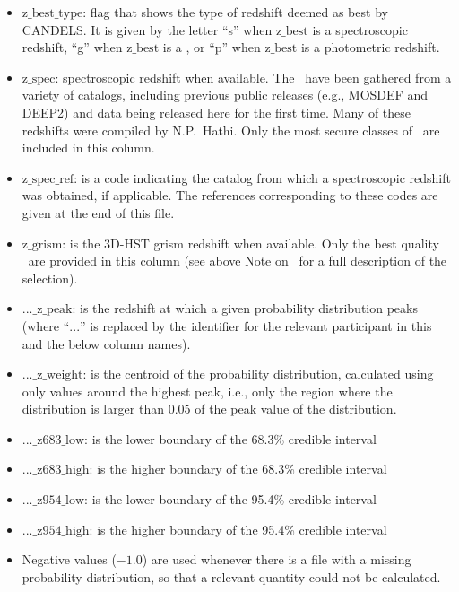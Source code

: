 \begin{itemize}
\item $\mathrm{z\_best\_type}$: flag that shows the type of redshift deemed as best by CANDELS.  It is given by the letter ``s'' when $\mathrm{z\_best}$ is a spectroscopic redshift, ``g'' when $\mathrm{z\_best}$ is a \grismz, or ``p'' when $\mathrm{z\_best}$ is a photometric redshift.

\item $\mathrm{z\_spec}$: spectroscopic redshift when available.  The \speczs\ have been gathered from a variety of catalogs, including previous public releases (e.g., MOSDEF and DEEP2) and data being released here for the first time.  Many of these redshifts were compiled by N.P.~Hathi. Only the most secure classes of \speczs\ are included in this column.

\item $\mathrm{z\_spec\_ref}$: is a code indicating the catalog from which a spectroscopic redshift was obtained, if applicable.
   The references corresponding to these codes are given at the end of this file.

\item $\mathrm{z\_grism}$: is the 3D-HST grism redshift when available.  Only the best quality \grismzs\ are provided in this column (see above Note on \zbest\ for a full description of the selection).

\item $\mathrm{...\_z\_peak}$: is the redshift at which a given probability distribution peaks
   (where ``$...$'' is replaced by the identifier for the relevant participant in this and the below column names).

\item $\mathrm{...\_z\_weight}$: is the centroid of the probability distribution, calculated using only values around the highest peak, i.e., only the region where the distribution is larger than 0.05 of the peak value of the distribution.

\item $\mathrm{...\_z683\_low}$: is the lower boundary of the 68.3\% credible interval

\item $\mathrm{...\_z683\_high}$: is the higher boundary of the 68.3\% credible interval

\item $\mathrm{...\_z954\_low}$: is the lower boundary of the 95.4\% credible interval

\item $\mathrm{...\_z954\_high}$: is the higher boundary of the 95.4\% credible interval

\item Negative values ($-1.0$) are used whenever there is a file with a missing probability distribution,
   so that a relevant quantity could not be calculated.

\end{itemize}
